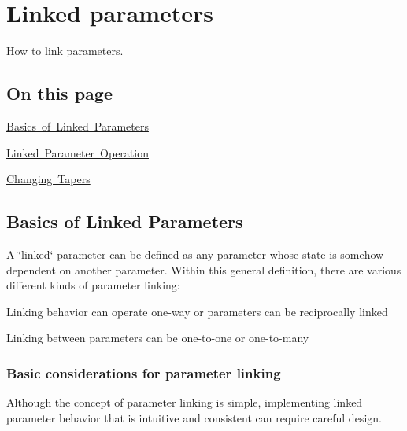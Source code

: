 \hypertarget{a00824}{}\section{Linked parameters}
\label{a00824}
How to link parameters. 

\hypertarget{a00824_linkedParameters_contents}{}\subsection{On this page}\label{a00824_linkedParameters_contents}
\begin{DoxyItemize}
\item \mbox{\hyperlink{a00824_linkedParameters_basics}{Basics of Linked Parameters}} \item \mbox{\hyperlink{a00824_linkedParameters_linkedParameterOperation}{Linked Parameter Operation}} \item \mbox{\hyperlink{a00824_linkedParameters_changingTapers}{Changing Tapers}}\end{DoxyItemize}
\hypertarget{a00824_linkedParameters_basics}{}\subsection{Basics of Linked Parameters}\label{a00824_linkedParameters_basics}
A \char`\"{}linked\char`\"{} parameter can be defined as any parameter whose state is somehow dependent on another parameter. Within this general definition, there are various different kinds of parameter linking\+:


\begin{DoxyItemize}
\item Linking behavior can operate one-\/way or parameters can be reciprocally linked
\item Linking between parameters can be one-\/to-\/one or one-\/to-\/many
\end{DoxyItemize}\hypertarget{a00824_linkedParameters_considerations}{}\subsubsection{Basic considerations for parameter linking}\label{a00824_linkedParameters_considerations}
Although the concept of parameter linking is simple, implementing linked parameter behavior that is intuitive and consistent can require careful design.


